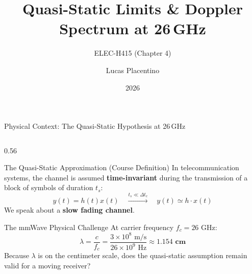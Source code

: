\documentclass[aspectratio=169, 10pt]{beamer}
\title[Quasi-Static Limits at 26\,GHz]{Quasi-Static Limits \& Doppler Spectrum at 26\,GHz}
\subtitle{ELEC-H415 (Chapter 4)}
\author[Lucas Placentino]{Lucas Placentino}
\institute[ULB]{École Polytechnique de Bruxelles \\ Université libre de Bruxelles}
\date{2026}
\begin{document}
\begin{frame}
    \titlepage
\end{frame}

\begin{frame}{Physical Context: The Quasi-Static Hypothesis at 26\,GHz}
\small
    \begin{columns}[T]
        \begin{column}{0.56\textwidth}
            \begin{block}{\small The Quasi-Static Approximation (Course Definition)}
                In telecommunication systems, the channel is assumed \textbf{time-invariant} during the transmission of a block of symbols of duration $t_s$:
                \begin{equation}
                    y(t) = h(t) x(t) \quad \xrightarrow{t_s \ll \Delta t_c} \quad y(t) \simeq h \cdot x(t)
                \end{equation}
                We speak about a \textbf{slow fading channel}.
            \end{block}
            \begin{alertblock}{\small The mmWave Physical Challenge}
                At carrier frequency $f_c = 26\text{ GHz}$:
                \begin{equation}
                    \lambda = \frac{c}{f_c} = \frac{3 \times 10^8\text{ m/s}}{26 \times 10^9\text{ Hz}} \approx \mathbf{1.154\text{ cm}}
                \end{equation}
                Because $\lambda$ is on the centimeter scale, does the quasi-static assumption remain valid for a moving receiver?
            \end{alertblock}
        \end{column}


\end{columns}
\end{frame}
\end{document}
